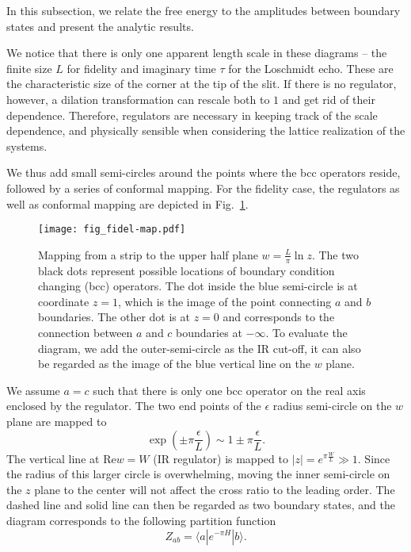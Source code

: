 
In this subsection, we relate the free energy to the amplitudes between boundary states and present the analytic results. 

We notice that there is only one apparent length scale in these diagrams -- the finite size $L$ for fidelity and imaginary time $\tau$ for the Loschmidt echo. These are the characteristic size of the corner at the tip of the slit. If there is no regulator, however, a dilation transformation can rescale both to $1$ and get rid of their dependence. Therefore, regulators are necessary in keeping track of the scale dependence, and physically sensible when considering the lattice realization of the systems. 

We thus add small semi-circles around the points where the bcc operators reside, followed by a series of conformal mapping. For the fidelity case, the regulators as well as conformal mapping are depicted in Fig.~\ref{fig:fidel-map}. 
\begin{figure}[h]
\centering
\texttt{[image: fig\_fidel-map.pdf]}
\caption{Mapping from a strip to the upper half plane $w = \frac{L}{\pi} \ln z $. The two black dots represent possible locations of boundary condition changing (bcc) operators. The dot inside the blue semi-circle is at coordinate $z = 1$, which is the image of the point connecting $a$ and $b$ boundaries. The other dot is at $z = 0$ and corresponds to the connection between $a$ and $c$ boundaries at $- \infty$. To evaluate the diagram, we add the outer-semi-circle as the IR cut-off, it can also be regarded as the image of the blue vertical line on the $w$ plane.}
\label{fig:fidel-map}
\end{figure}
We assume $a = c$ such that there is only one bcc operator on the real axis enclosed by the regulator. The two end points of the $\epsilon$ radius semi-circle on the $w$ plane are mapped to
\begin{equation}
\exp( \pm \pi \frac{\epsilon}{ L}  ) \sim 1 \pm \pi \frac{\epsilon}{L} .
\end{equation}
The vertical line at $\text{Re} w = W$ (IR regulator) is mapped to $|z| = e^{\pi \frac{W}{L} } \gg 1 $. Since the radius of this larger circle is overwhelming, moving the inner semi-circle on the $z$ plane to the center will not affect the cross ratio to the leading order. The dashed line and solid line can then be regarded as two boundary states, and the diagram corresponds to the following partition function 
\begin{equation}
  Z_{ab} = \langle a | e^{-\pi H } |b \rangle .
\end{equation}


